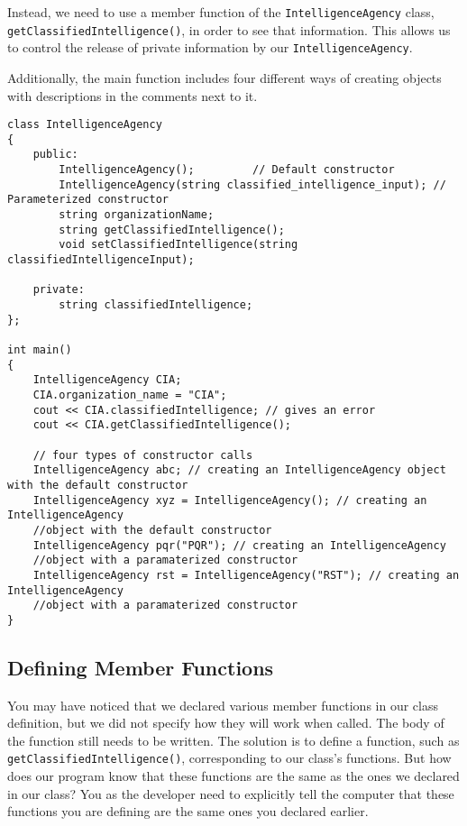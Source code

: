 Instead, we need to use a member function of the \texttt{IntelligenceAgency} class, \texttt{getClassifiedIntelligence()}, in order to see that information. This allows us to control the release of private information by our \texttt{IntelligenceAgency}.

Additionally, the main function includes four different ways of creating objects with descriptions in the comments next to it.

\begin{verbatim}
class IntelligenceAgency
{
    public:
        IntelligenceAgency();         // Default constructor
        IntelligenceAgency(string classified_intelligence_input); // Parameterized constructor  
        string organizationName;
        string getClassifiedIntelligence();
        void setClassifiedIntelligence(string classifiedIntelligenceInput);

    private:
        string classifiedIntelligence;
};

int main()
{
    IntelligenceAgency CIA;
    CIA.organization_name = "CIA";
    cout << CIA.classifiedIntelligence; // gives an error
    cout << CIA.getClassifiedIntelligence();
    
    // four types of constructor calls
    IntelligenceAgency abc; // creating an IntelligenceAgency object with the default constructor 
    IntelligenceAgency xyz = IntelligenceAgency(); // creating an IntelligenceAgency 
    //object with the default constructor 
    IntelligenceAgency pqr("PQR"); // creating an IntelligenceAgency 
    //object with a paramaterized constructor
    IntelligenceAgency rst = IntelligenceAgency("RST"); // creating an IntelligenceAgency 
    //object with a paramaterized constructor
}
\end{verbatim}

\subsection{Defining Member Functions}
You may have noticed that we declared various member functions in our class definition, but we did not specify how they will work when called. The body of the function still needs to be written. The solution is to define a function, such as \texttt{getClassifiedIntelligence()}, corresponding to our class’s functions. But how does our program know that these functions are the same as the ones we declared in our class? You as the developer need to explicitly tell the computer that these functions you are defining are the same ones you declared earlier.

